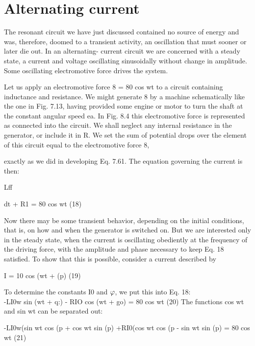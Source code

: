\iffalse

\section{Alternating current}

The resonant circuit we have just discussed contained no source
of energy and was, therefore, doomed to a transient activity, an
oscillation that must sooner or later die out. In an alternating-
current circuit we are concerned with a steady state, a current and
voltage oscillating sinusoidally without change in amplitude. Some
oscillating electromotive force drives the system.

Let us apply an electromotive force 8 = 80 cos wt to a circuit containing
inductance and resistance. We might generate 8 by a
machine schematically like the one in Fig. 7.13, having provided
some engine or motor to turn the shaft at the constant angular
speed ea. In Fig. 8.4 this electromotive force is represented as connected
into the circuit. We shall neglect any internal resistance in
the generator, or include it in R. We set the sum of potential drops
over the element of this circuit equal to the electromotive force 8,

exactly as we did in developing Eq. 7.61. The equation governing
the current is then:

\begin{equation}
\end{equation}
Lff

dt + R1 = 80 cos wt (18)

Now there may be some transient behavior, depending on the
initial conditions, that is, on how and when the generator is switched
on. But we are interested only in the steady state, when the current
is oscillating obediently at the frequency of the driving force, with
the amplitude and phase necessary to keep Eq. 18 satisfied. To show
that this is possible, consider a current described by

\begin{equation}
\end{equation}
I = 10 cos (wt + (p) (19)

To determine the constants I0 and $\varphi$, we put this into Eq. 18:
\begin{equation}
\end{equation}
-LI0w sin (wt + q:) - RIO cos (wt + go) = 80 cos wt (20)
The functions cos wt and sin wt can be separated out:

-LI0w(sin wt cos (p + cos wt sin (p)
+RI0(cos wt cos (p - sin wt sin (p) = 80 cos wt (21)


